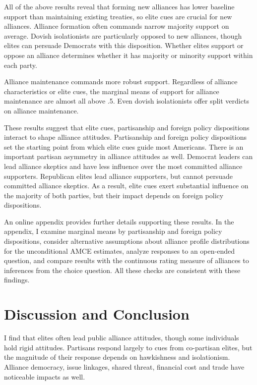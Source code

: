 \documentclass[12pt]{article}
\begin{document}
All of the above results reveal that forming new alliances has lower baseline support than maintaining existing treaties, so elite cues are crucial for new alliances. 
Alliance formation often commands narrow majority support on average.
Dovish isolationists are particularly opposed to new alliances, though elites can persuade Democrats with this disposition. 
Whether elites support or oppose an alliance determines whether it has majority or minority support within each party. 


Alliance maintenance commands more robust support. 
Regardless of alliance characteristics or elite cues, the marginal means of support for alliance maintenance are almost all above .5. 
Even dovish isolationists offer split verdicts on alliance maintenance.


These results suggest that elite cues, partisanship and foreign policy dispositions interact to shape alliance attitudes.
Partisanship and foreign policy dispositions set the starting point from which elite cues guide most Americans. 
There is an important partisan asymmetry in alliance attitudes as well. 
Democrat leaders can lead alliance skeptics and have less influence over the most committed alliance supporters. 
Republican elites lead alliance supporters, but cannot persuade committed alliance skeptics. 
As a result, elite cues exert substantial influence on the majority of both parties, but their impact depends on foreign policy dispositions. 


An online appendix provides further details supporting these results. 
In the appendix, I examine marginal means by partisanship and foreign policy dispositions, consider alternative assumptions about alliance profile distributions for the unconditional AMCE estimates, analyze responses to an open-ended question, and compare results with the continuous rating measure of alliances to inferences from the choice question.
All these checks are consistent with these findings. 


\section{Discussion and Conclusion} 


I find that elites often lead public alliance attitudes, though some individuals hold rigid attitudes. 
Partisans respond largely to cues from co-partisan elites, but the magnitude of their response depends on hawkishness and isolationism. 
Alliance democracy, issue linkages, shared threat, financial cost and trade have noticeable impacts as well.  
\end{document}
